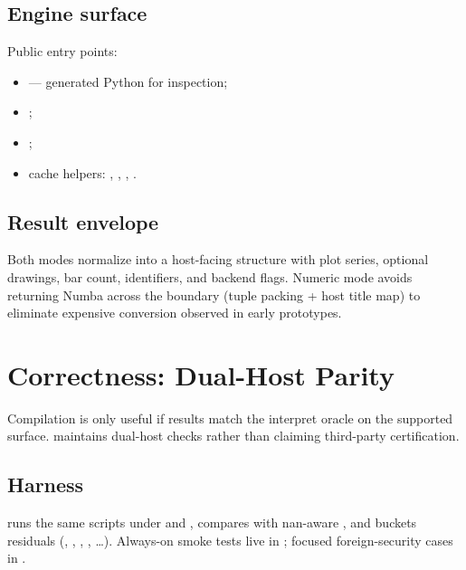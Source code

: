 \documentclass[11pt,a4paper]{article}
\begin{document}
\subsection{Engine \api{} surface}

Public entry points:
\begin{itemize}[leftmargin=*]
  \item {} --- generated Python for inspection;
  \item {};
  \item {};
  \item cache helpers: ,
        ,
        , .
\end{itemize}

\subsection{Result envelope}

Both modes normalize into a host-facing structure with plot series, optional
drawings, bar count, identifiers, and backend flags. Numeric mode avoids
returning Numba  across the boundary (tuple packing + host
title map) to eliminate expensive conversion observed in early prototypes.

\section{Correctness: Dual-Host Parity}
\label{sec:parity}

Compilation is only useful if results match the interpret oracle on the
supported surface. \pyne{} maintains dual-host checks rather than claiming
third-party certification.

\subsection{Harness}

 runs the same scripts under
 and , compares
 with nan-aware , and buckets residuals
(, , ,
, \ldots). Always-on smoke tests live in
; focused foreign-security cases
in .
\end{document}
